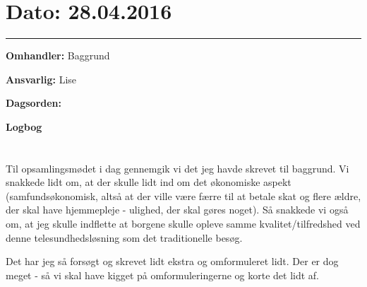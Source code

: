 \section{Dato: 28.04.2016}
\hrule

\textbf{Omhandler:} Baggrund

\textbf{Ansvarlig:} Lise

\textbf{Dagsorden:}


\textbf{Logbog}
\\
\\ \\
Til opsamlingsmødet i dag gennemgik vi det jeg havde skrevet til baggrund. Vi snakkede lidt om, at der skulle lidt ind om det økonomiske aspekt (samfundsøkonomisk, altså at der ville være færre til at betale skat og flere ældre, der skal have hjemmepleje - ulighed, der skal gøres noget). Så snakkede vi også om, at jeg skulle indflette at borgene skulle opleve samme kvalitet/tilfredshed ved denne telesundhedsløsning som det traditionelle besøg. 

Det har jeg så forsøgt og skrevet lidt ekstra og omformuleret lidt. Der er dog meget - så vi skal have kigget på omformuleringerne og korte det lidt af.  



